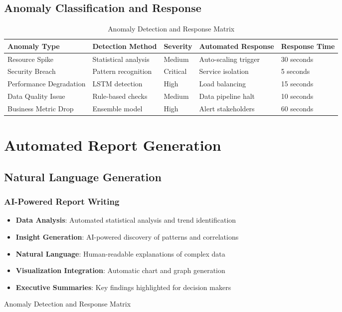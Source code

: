 \begin{figure}[H]
\subsection{Anomaly Classification and Response}

\begin{table}[H]
\centering
\caption{Anomaly Detection and Response Matrix}
\begin{tabular}{|p{2.5cm}|p{2.5cm}|p{2cm}|p{3cm}|p{2cm}|}
\hline
\textbf{Anomaly Type} & \textbf{Detection Method} & \textbf{Severity} & \textbf{Automated Response} & \textbf{Response Time} \\
\hline
Resource Spike & Statistical analysis & Medium & Auto-scaling trigger & 30 seconds \\
\hline
Security Breach & Pattern recognition & Critical & Service isolation & 5 seconds \\
\hline
Performance Degradation & LSTM detection & High & Load balancing & 15 seconds \\
\hline
Data Quality Issue & Rule-based checks & Medium & Data pipeline halt & 10 seconds \\
\hline
Business Metric Drop & Ensemble model & High & Alert stakeholders & 60 seconds \\
\hline
\end{tabular}
\end{table}

\section{Automated Report Generation}

\subsection{Natural Language Generation}

\subsubsection{AI-Powered Report Writing}

\begin{itemize}
    \item \textbf{Data Analysis}: Automated statistical analysis and trend identification
    \item \textbf{Insight Generation}: AI-powered discovery of patterns and correlations
    \item \textbf{Natural Language}: Human-readable explanations of complex data
    \item \textbf{Visualization Integration}: Automatic chart and graph generation
    \item \textbf{Executive Summaries}: Key findings highlighted for decision makers
\end{itemize}


\end{figure}
